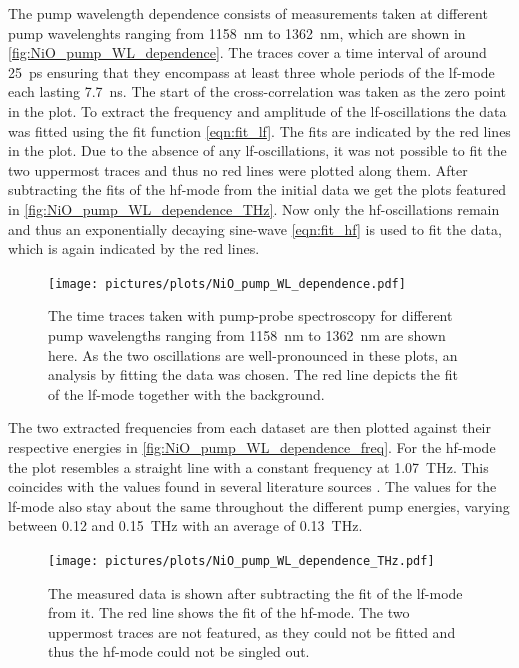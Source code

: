 The pump wavelength dependence consists of measurements taken at different pump wavelenghts ranging from \qty{1158}{nm} to \qty{1362}{nm}, which are shown in \autoref{fig:NiO_pump_WL_dependence}.
The traces cover a time interval of around \qty{25}{ps} ensuring that they encompass at least three whole periods of the lf-mode each lasting \qty{7.7}{ns}.
The start of the cross-correlation was taken as the zero point in the plot.
To extract the frequency and amplitude of the lf-oscillations the data was fitted using the fit function \autoref{eqn:fit_lf}.
The fits are indicated by the red lines in the plot. 
Due to the absence of any lf-oscillations, it was not possible to fit the two uppermost traces and thus no red lines were plotted along them.
After subtracting the fits of the hf-mode from the initial data we get the plots featured in \autoref{fig:NiO_pump_WL_dependence_THz}.
Now only the hf-oscillations remain and thus an exponentially decaying sine-wave \autoref{eqn:fit_hf} is used to fit the data, which is again indicated by the red lines.
\begin{figure}[ht]
    \centering
    \texttt{[image: pictures/plots/NiO\_pump\_WL\_dependence.pdf]}
    \caption{The time traces taken with pump-probe spectroscopy for different pump wavelengths ranging from \qty{1158}{nm} to \qty{1362}{nm} are shown here. As the two oscillations are well-pronounced in these plots, an analysis by fitting the data was chosen. The red line depicts the fit of the lf-mode together with the background.}
    \label{fig:NiO_pump_WL_dependence}
\end{figure}
\FloatBarrier
The two extracted frequencies from each dataset are then plotted against their respective energies in \autoref{fig:NiO_pump_WL_dependence_freq}.
For the hf-mode the plot resembles a straight line with a constant frequency at \qty{1.07}{THz}.
This coincides with the values found in several literature sources .
The values for the lf-mode also stay about the same throughout the different pump energies, varying between 0.12 and \qty{0.15}{THz} with an average of \qty{0.13}{THz}.
\begin{figure}[ht]
    \centering
    \texttt{[image: pictures/plots/NiO\_pump\_WL\_dependence\_THz.pdf]}
    \caption{The measured data is shown after subtracting the fit of the lf-mode from it. The red line shows the fit of the hf-mode. The two uppermost traces are not featured, as they could not be fitted and thus the hf-mode could not be singled out.}
    \label{fig:NiO_pump_WL_dependence_THz}
\end{figure}
